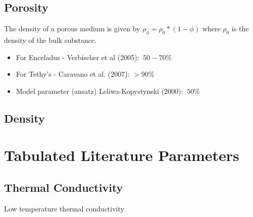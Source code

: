 \documentclass[11pt]{article} %
\begin{document}
\subsection{Porosity}
\label{sec:porosity}

	The density of a porous medium is given by $\rho_{\phi} = \rho_{0}*(1-\phi)$ where $\rho_{0}$ is the density of the bulk substance. 

	\begin{itemize}
	\item For Enceladus - Verbischer et al (2005): $~50-70\%$
	\item For Tethy's - Caravano et al. (2007): $>90\%$ 
	\item Model parameter (ansatz) Leliwa-Kopystynski (2000): $~50\%$
	\end{itemize}
	
\subsection{Density}

\section{Tabulated Literature Parameters}
\label{sec:tabulated}
	
\subsection{Thermal Conductivity}
\label{sec:tconductivity}
	
	Low temperature thermal conductivity
	
\end{document}
